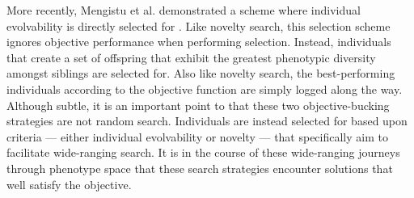 More recently, Mengistu et al. demonstrated a scheme where individual evolvability is directly selected for  \cite{Mengistu2016EvolvabilityIt}.
Like novelty search, this selection scheme ignores objective performance when performing selection.
Instead, individuals that create a set of offspring that exhibit the greatest phenotypic diversity amongst siblings are selected for.
Also like novelty search, the best-performing individuals according to the objective function are simply logged along the way.
Although subtle, it is an important point to that these two objective-bucking strategies are not random search. Individuals are instead selected for based upon criteria --- either individual evolvability or novelty --- that specifically aim to facilitate wide-ranging search. 
It is in the course of these wide-ranging journeys through phenotype space that these search strategies encounter solutions that well satisfy the objective.
